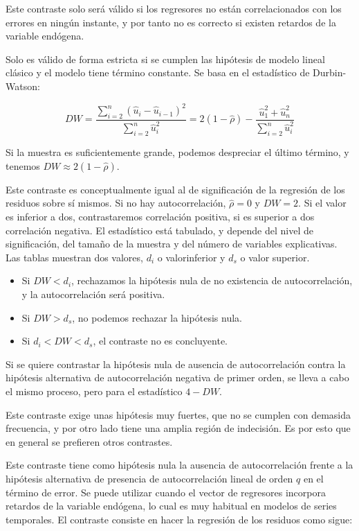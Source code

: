 Este contraste solo ser\'a v\'alido si los regresores no est\'an correlacionados con los errores en ning\'un instante, y por tanto no es correcto si existen retardos de la variable end\'ogena.

Solo es v\'alido de forma estricta si se cumplen las hip\'otesis de modelo lineal cl\'asico y el modelo tiene t\'ermino constante. Se basa en el estad\'istico de Durbin-Watson:

\[
DW=\dfrac{\sum_{i=2}^{n}\left(\hat{u}_{i}-\hat{u}_{i-1}\right)^{2}}{\sum_{i=2}^{n}\hat{u}_{i}^{2}}=2(1-\hat{\rho})-\dfrac{\hat{u}_1^2+\hat{u}_n^2}{\sum_{i=2}^{n}\hat{u}_{i}^{2}}
\]

Si la muestra es suficientemente grande, podemos despreciar el \'ultimo t\'ermino, y tenemos $DW\approx 2(1-\hat{\rho})$.

Este contraste es conceptualmente igual al de significaci\'on de la regresi\'on de los residuos sobre s\'i mismos. Si no hay autocorrelaci\'on, $\hat{\rho}=0$ y $DW=2$. Si el valor es inferior a dos, contrastaremos correlaci\'on positiva, si es superior a dos correlaci\'on negativa. El estad\'istico est\'a tabulado, y depende del nivel de significaci\'on, del tama\~no de la muestra y del n\'umero de variables explicativas. Las tablas muestran dos valores, $d_i$ o valorinferior y $d_s$ o valor superior.
\begin{itemize}
\item Si $DW<d_i$, rechazamos la hip\'otesis nula de no existencia de autocorrelaci\'on, y la autocorrelaci\'on ser\'a positiva.
\item Si $DW>d_s$, no podemos rechazar la hip\'otesis nula.
\item Si $d_i<DW<d_s$, el contraste no es concluyente.
\end{itemize}

Si se quiere contrastar la hip\'otesis nula de ausencia de autocorrelaci\'on contra la hip\'otesis alternativa de autocorrelaci\'on negativa de primer orden, se lleva a cabo el mismo proceso, pero para el estad\'istico $4-DW$.

Este contraste exige unas hip\'otesis muy fuertes, que no se cumplen con demasida frecuencia, y por otro lado tiene una amplia regi\'on de indecisi\'on. Es por esto que en general se prefieren otros contrastes.


Este contraste tiene como hip\'otesis nula la ausencia de autocorrelaci\'on frente a la hip\'otesis alternativa de presencia de autocorrelaci\'on lineal de orden $q$ en el t\'ermino de error. Se puede utilizar cuando el vector de regresores incorpora retardos de la variable end\'ogena, lo cual es muy habitual en modelos de series temporales. El contraste consiste en hacer la regresi\'on de los residuos como sigue:

